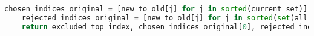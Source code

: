 \begin{lstlisting}[language=Python]
    chosen_indices_original = [new_to_old[j] for j in sorted(current_set)]
    rejected_indices_original = [new_to_old[j] for j in sorted(set(all_indices) - current_set)]
    return excluded_top_index, chosen_indices_original[0], rejected_indices_original[:k], chosen_indices_original, rejected_indices_original
\end{lstlisting}